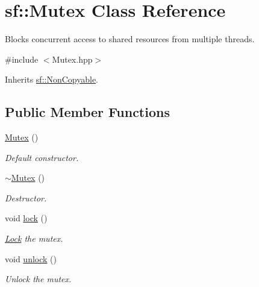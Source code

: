 \hypertarget{classsf_1_1_mutex}{\section{sf\+:\+:Mutex Class Reference}
\label{classsf_1_1_mutex}
}


Blocks concurrent access to shared resources from multiple threads.  




{\ttfamily \#include $<$Mutex.\+hpp$>$}



Inherits \hyperlink{classsf_1_1_non_copyable}{sf\+::\+Non\+Copyable}.

\subsection*{Public Member Functions}
\begin{DoxyCompactItemize}
\item 
\hypertarget{classsf_1_1_mutex_a9bd52a48320fd7b6db8a78037aad276e}{\hyperlink{classsf_1_1_mutex_a9bd52a48320fd7b6db8a78037aad276e}{Mutex} ()}\label{classsf_1_1_mutex_a9bd52a48320fd7b6db8a78037aad276e}

\begin{DoxyCompactList}\small\item\em Default constructor. \end{DoxyCompactList}\item 
\hypertarget{classsf_1_1_mutex_a9f76a67b7b6d3918131a692179b4e3f2}{\hyperlink{classsf_1_1_mutex_a9f76a67b7b6d3918131a692179b4e3f2}{$\sim$\+Mutex} ()}\label{classsf_1_1_mutex_a9f76a67b7b6d3918131a692179b4e3f2}

\begin{DoxyCompactList}\small\item\em Destructor. \end{DoxyCompactList}\item 
void \hyperlink{classsf_1_1_mutex_a1a16956a6bbea764480c1b80f2e45763}{lock} ()
\begin{DoxyCompactList}\small\item\em \hyperlink{classsf_1_1_lock}{Lock} the mutex. \end{DoxyCompactList}\item 
void \hyperlink{classsf_1_1_mutex_ade71268ffc5e80756652058b01c23c33}{unlock} ()
\begin{DoxyCompactList}\small\item\em Unlock the mutex. \end{DoxyCompactList}\end{DoxyCompactItemize}


